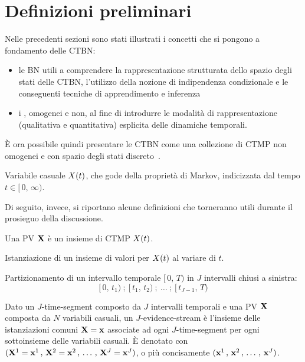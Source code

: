 \section{Definizioni preliminari}
\label{sec:Definizioni preliminari}
Nelle precedenti sezioni sono stati illustrati i concetti che si pongono a fondamento delle \acl{CTBN}:
\begin{itemize}
    \item le \acl{BN} utili a comprendere la rappresentazione strutturata dello spazio degli stati delle \acs{CTBN}, l'utilizzo della nozione di indipendenza condizionale e le conseguenti tecniche di apprendimento e inferenza
    \item i \mprocess{}, omogenei e non, al fine di introdurre le modalità di rappresentazione (qualitativa e quantitativa) esplicita delle dinamiche temporali.
\end{itemize}

\`E ora possibile quindi presentare le \acl{CTBN} come una collezione di \ac{CTMP} non omogenei e con spazio degli stati discreto~\cite{Nodelman2007}.

\begin{definizione}
Variabile casuale $\mathnormal{X}(t)$, che gode della proprietà di Markov, indicizzata dal tempo $t\in[\,0,\,\infty)$.
\end{definizione}

Di seguito, invece, si riportano alcune definizioni che torneranno utili durante il prosieguo della discussione.

\begin{definizione}[\ACL{PV}]
    Una \acf{PV} $\mathbf{X}$ è un insieme di \acl{CTMP} $\mathnormal{X}(t)$.
\end{definizione}

\begin{definizione}[Traiettoria]
    Istanziazione di un insieme di valori per $\mathnormal{X}(t)$ al variare di $t$.
\end{definizione}

\begin{definizione}
Partizionamento di un intervallo temporale $[\,0,\,T)$ in $J$ intervalli chiusi a sinistra:
\[
[\,0,\,t_1)\:;\:[\,t_1,\,t_2)\:;\:\dotsc\:;\:[\,t_{J-1},\,T)
\]
\end{definizione}

\begin{definizione}
Dato un $J$-time-segment composto da $J$ intervalli temporali e una \acl{PV} $\mathbf{X}$ composta da $N$ variabili casuali, un $J$-evidence-stream è l'insieme delle istanziazioni comuni $\mathbf{X}=\mathbf{x}$ associate ad ogni $J$-time-segment per ogni sottoinsieme delle variabili casuali. \`E denotato con $(\mathbf{X}^1=\mathbf{x}^1\,,\,\mathbf{X}^2=\mathbf{x}^2\,,\,\dotsc\,,\,\mathbf{X}^J=\mathbf{x}^J)$, o più concisamente $(\mathbf{x}^1\,,\,\mathbf{x}^2\,,\,\dotsc\,,\,\mathbf{x}^J)$.
\end{definizione}

